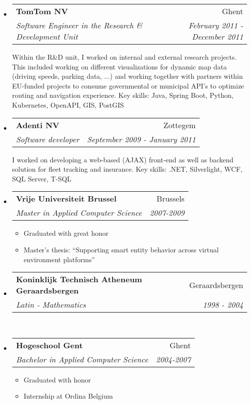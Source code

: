 \documentclass[letterpaper,11pt]{article}
\makeatletter
\newcommand{\resitem}[1]{\item #1 \vspace{-2pt}}
\newcommand{\resheading}[1]{{\large \parashade[.9]{sharpcorners}{\textbf{#1 \vphantom{p\^{E}}}}}}
\newcommand{\ressubheading}[4]{
	\begin{tabular*}{6.5in}{l@{\extracolsep{\fill}}r}
		\textbf{#1} & #2 \\
		\textit{#3} & \textit{#4} \\
	\end{tabular*}\vspace{-6pt}}
\makeatother
\begin{document}
\begin{itemize}
		\item
		\ressubheading{TomTom NV}{Ghent}{Software Engineer in the Research \& Development Unit}{February 2011 - December 2011}
		\begin{flushleft}
		Within the R\&D unit, I worked on internal and external research projects. This included working on different visualizations for dynamic map data (driving speeds, parking data, ...) and working together with partners within EU-funded projects to consume governmental or municipal API's to optimize routing and navigation experience.
		\break
		Key skills: Java, Spring Boot, Python, Kubernetes, OpenAPI, GIS, PostGIS
		\end{flushleft}
			\end{itemize}
		
		\pagebreak
		\hfill
			\begin{itemize}
			\vspace{0.2in}
		\item 
		\ressubheading{Adenti NV}{Zottegem}{Software developer}{September 2009 - January 2011}
		\begin{flushleft}
		I worked on developing a web-based (AJAX) front-end as well as backend solution for fleet tracking and insurance.
		\break
		Key skills: .NET, Silverlight, WCF, SQL Server, T-SQL
		\end{flushleft}
		
	\end{itemize}
			\vspace{-0.2in}
	\resheading{Education}
	\begin{itemize}
		
		\item
		\ressubheading{Vrije Universiteit Brussel}{Brussels}{Master in Applied Computer Science}{2007-2009}
		\begin{itemize}
			\resitem{Graduated with great honor}
			\resitem{Master's thesis: ``Supporting smart entity behavior across virtual environment platforms''}
		\end{itemize}
		
		\item
		\ressubheading{Koninklijk Technisch Atheneum Geraardsbergen}{Geraardsbergen}{Latin - Mathematics}{1998 - 2004}
		\\
		
		\item
		\ressubheading{Hogeschool Gent}{Ghent}{Bachelor in Applied Computer Science}{2004-2007}
		\begin{itemize}
			\resitem{Graduated with honor}
			\resitem{Internship at Ordina Belgium}
		\end{itemize}
		
	\end{itemize}
	
\end{document}
